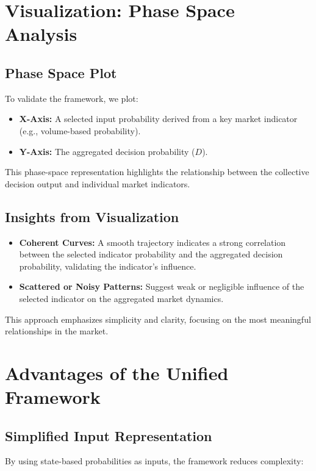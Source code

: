 \documentclass[a4]{article}
\begin{document}
\section{Visualization: Phase Space Analysis}

\subsection{Phase Space Plot}
To validate the framework, we plot:

\begin{itemize}
\item  {\bf X-Axis:} A selected input probability derived from a key market indicator (e.g., volume-based probability).  
\item {\bf Y-Axis:} The aggregated decision probability ($D$).  
\end{itemize}

This phase-space representation highlights the relationship between the collective decision output and individual market indicators.

\subsection{Insights from Visualization}

\begin{itemize}
\item  {\bf Coherent Curves:} A smooth trajectory indicates a strong correlation between the selected indicator probability and the aggregated decision probability, validating the indicator's influence.  
\item {\bf Scattered or Noisy Patterns:} Suggest weak or negligible influence of the selected indicator on the aggregated market dynamics.
\end{itemize}

This approach emphasizes simplicity and clarity, focusing on the most meaningful relationships in the market.

\section{Advantages of the Unified Framework}

\subsection{Simplified Input Representation}
By using state-based probabilities as inputs, the framework reduces complexity:
\end{document}
